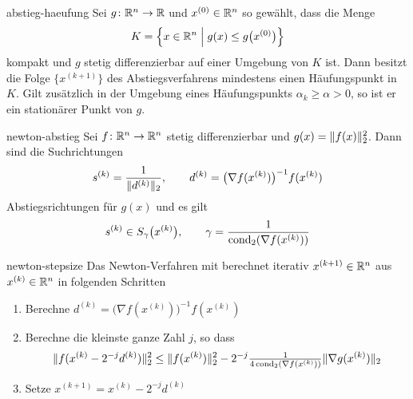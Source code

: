 \begin{Satz}{abstieg-haeufung}
  Sei $g\colon \mathbb R^n\to \mathbb R$ und $x^{(0)} \in\mathbb R^n$ so gewählt, dass die Menge
  \begin{gather}
    K = \Bigl\{x\in\mathbb R^n \; \Big| \; g(x) \le g\bigl(x^{(0)}\bigr) \Bigr\}
  \end{gather}
  kompakt und $g$ stetig differenzierbar auf einer Umgebung von $K$
  ist. Dann besitzt die Folge $\{x^{(k+1)}\}$ des Abstiegsverfahrens
  mindestens einen Häufungspunkt in $K$. Gilt zusätzlich in der
  Umgebung eines Häufungspunkts $\alpha_k \ge \alpha>0$, so ist er
  ein stationärer Punkt von $g$.
\end{Satz}

\begin{Lemma}{newton-abstieg}
  Sei $f\colon \mathbb R^n\to \mathbb R^n$ stetig differenzierbar und
  $g(x) = \lVert f(x)\rVert_2^2$.  Dann sind die Suchrichtungen
  \begin{gather}
    s^{(k)} = \frac1{\lVert d^{(k)}\rVert_2},
    \qquad d^{(k)} = \bigl(\nabla f(x^{(k)})\bigr)^{-1}f(x^{(k)})
  \end{gather}
  Abstiegsrichtungen für $g(x)$ und es gilt
  \begin{gather}
    s^{(k)} \in S_\gamma\bigl(x^{(k)}\bigr),
    \qquad
    \gamma = \frac{1}{\operatorname{cond}_2(\nabla f(x^{(k)}))}
  \end{gather}
\end{Lemma}

\begin{Definition}{newton-stepsize}
  Das Newton-Verfahren mit  berechnet iterativ
  $x^{(k+1)}\in \mathbb R^n$ aus $x^{(k)}\in \mathbb R^n$ in folgenden Schritten
  \begin{enumerate}
  \item Berechne $d^{(k)} = \bigl(\nabla f(x^{(k)})\bigr)^{-1}f(x^{(k)})$
  \item Berechne die kleinste ganze Zahl $j$, so dass
    \begin{gather}
      \lVert f(x^{(k)}-2^{-j} d^{(k)})\rVert_2^2
      \le \lVert f(x^{(k)})\rVert_2^2 - 2^{-j}
      \tfrac{1}{4\operatorname{cond}_2(\nabla f(x^{(k)}))} \lVert\nabla g(x^{(k)})\rVert_2
    \end{gather}
    \item Setze $x^{(k+1)}=x^{(k)}-2^{-j} d^{(k)}$
  \end{enumerate}
\end{Definition}

